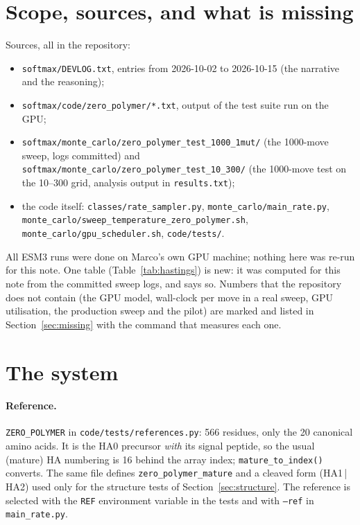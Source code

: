 \documentclass[11pt,a4paper]{article}
\newcommand{\file}[1]{\texttt{#1}}
\newcommand{\missing}[1]{\fcolorbox{red}{red!8}{\textcolor{red!70!black}{\small\textbf{MISSING:} #1}}}
\begin{document}
\section{Scope, sources, and what is missing}
Sources, all in the repository:
\begin{itemize}
  \item \file{softmax/DEVLOG.txt}, entries from 2026-10-02 to 2026-10-15
        (the narrative and the reasoning);
  \item \file{softmax/code/zero\_polymer/*.txt}, output of the test suite run on
        the GPU;
  \item \file{softmax/monte\_carlo/zero\_polymer\_test\_1000\_1mut/} (the 1000-move
        sweep, logs committed) and
        \file{softmax/monte\_carlo/zero\_polymer\_test\_10\_300/} (the 1000-move
        test on the 10--300 grid, analysis output in \file{results.txt});
  \item the code itself: \file{classes/rate\_sampler.py},
        \file{monte\_carlo/main\_rate.py},
        \file{monte\_carlo/sweep\_temperature\_zero\_polymer.sh},
        \file{monte\_carlo/gpu\_scheduler.sh}, \file{code/tests/}.
\end{itemize}
All ESM3 runs were done on Marco's own GPU machine; nothing here was re-run for
this note. One table (Table~\ref{tab:hastings}) is new: it was computed for this
note from the committed sweep logs, and says so. Numbers that the repository
does not contain (the GPU model, wall-clock per move in a real sweep, GPU
utilisation, the production sweep and the pilot) are marked
\missing{like this} and listed in Section~\ref{sec:missing} with the command
that measures each one.

\section{The system}
\paragraph{Reference.} \texttt{ZERO\_POLYMER} in \file{code/tests/references.py}:
566 residues, only the 20 canonical amino acids. It is the HA0 precursor
\emph{with} its signal peptide, so the usual (mature) HA numbering is 16 behind
the array index; \texttt{mature\_to\_index()} converts. The same file defines
\texttt{zero\_polymer\_mature} and a cleaved form (HA1\,|\,HA2) used only for the
structure tests of Section~\ref{sec:structure}. The reference is selected with
the \texttt{REF} environment variable in the tests and with \texttt{--ref} in
\file{main\_rate.py}.
\end{document}
